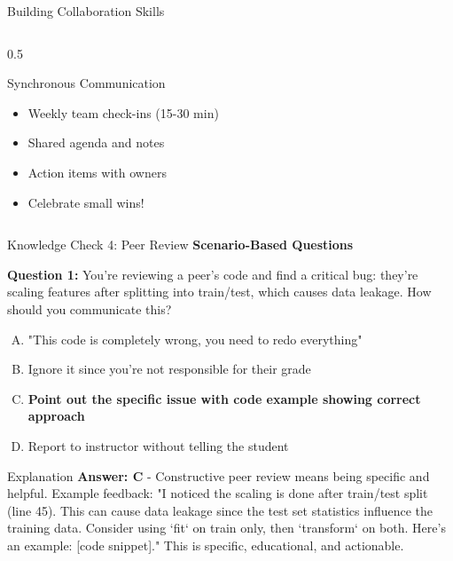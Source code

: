 \begin{frame}{Building Collaboration Skills}
\begin{columns}
\begin{column}{0.5\textwidth}
\begin{block}{Synchronous Communication}
\begin{itemize}
\item Weekly team check-ins (15-30 min)
\item Shared agenda and notes
\item Action items with owners
\item Celebrate small wins!
\end{itemize}
\end{block}
\end{column}
\end{columns}
\end{frame}


\begin{frame}{Knowledge Check 4: Peer Review}
\textbf{Scenario-Based Questions}

\vspace{0.3cm}

\textbf{Question 1:} You're reviewing a peer's code and find a critical bug: they're scaling features after splitting into train/test, which causes data leakage. How should you communicate this?

\begin{enumerate}[A)]
\item "This code is completely wrong, you need to redo everything"
\item Ignore it since you're not responsible for their grade
\item \textcolor{forest}{\textbf{Point out the specific issue with code example showing correct approach}}
\item Report to instructor without telling the student
\end{enumerate}

\pause

\begin{block}{Explanation}
\textcolor{forest}{\textbf{Answer: C}} - Constructive peer review means being specific and helpful. Example feedback: "I noticed the scaling is done after train/test split (line 45). This can cause data leakage since the test set statistics influence the training data. Consider using `fit` on train only, then `transform` on both. Here's an example: [code snippet]." This is specific, educational, and actionable.
\end{block}

\pause


\end{frame}
